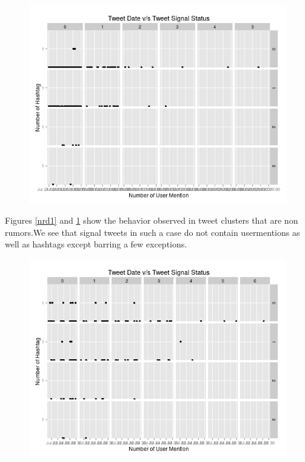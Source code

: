 \begin{figure}[H]	
	\centering
	\begin{minipage}{.7\linewidth}
		\includegraphics[width=\linewidth]{images/qp_nrumor2.jpeg}
		\label{nrd2}
	\end{minipage}
\end{figure}

 Figures \ref{nrd1} and \ref{nrd2} show the behavior observed in tweet clusters that are non rumors.We see that signal tweets in such a case do not contain usermentions as well as hashtags except barring a few exceptions.

\begin{figure}[H]
	\centering
	\begin{minipage}{.7\linewidth}
		\includegraphics[width=\linewidth]{images/qp_rumor1.jpeg}
		\label{rd1}
	\end{minipage}
\end{figure}
	
